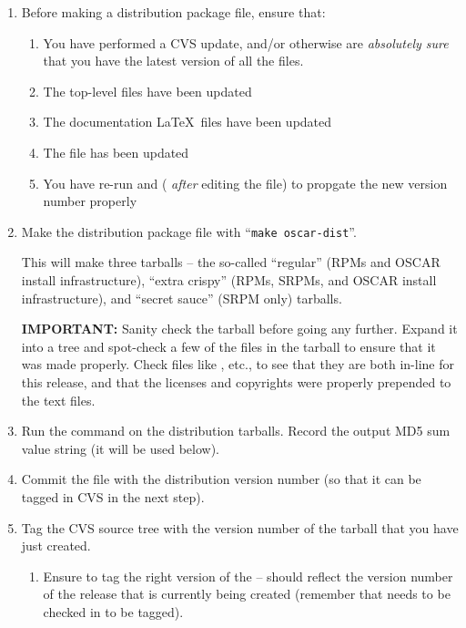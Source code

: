 \begin{enumerate}

\item Before making a distribution package file, ensure that:

  \begin{enumerate}
  \item You have performed a CVS update, and/or otherwise are {\em
      absolutely sure} that you have the latest version of all the
    files.
  \item The top-level  files have been updated
  \item The documentation \LaTeX\ files have been updated
  \item The  file has been updated
  \item You have re-run  and  ({\em
      after} editing the  file) to propgate the new
    version number properly
  \end{enumerate}
  
\item Make the distribution package file with ``{\tt make
    oscar-dist}''.
  
  This will make three tarballs -- the so-called ``regular'' (RPMs and
  OSCAR install infrastructure), ``extra crispy'' (RPMs, SRPMs, and
  OSCAR install infrastructure), and ``secret sauce'' (SRPM only)
  tarballs.
  
  {\bf IMPORTANT:} Sanity check the tarball before going any further.
  Expand it into a tree and spot-check a few of the files in the
  tarball to ensure that it was made properly.  Check files like
  , etc., to see that they are both in-line for this
  release, and that the licenses and copyrights were properly
  prepended to the text files.
  
\item Run the  command on the distribution tarballs.
  Record the output MD5 sum value string (it will be used below).
\label{dist-step-md5sum}
        
\item Commit the  file with the distribution version
  number (so that it can be tagged in CVS in the next step).

\item Tag the CVS source tree with the version number of the tarball
  that you have just created.  

  \begin{enumerate}
  \item Ensure to tag the right version of the  --
     should reflect the version number of the release
    that is currently being created (remember that 
    needs to be checked in to be tagged).


\end{enumerate}
\end{enumerate}
